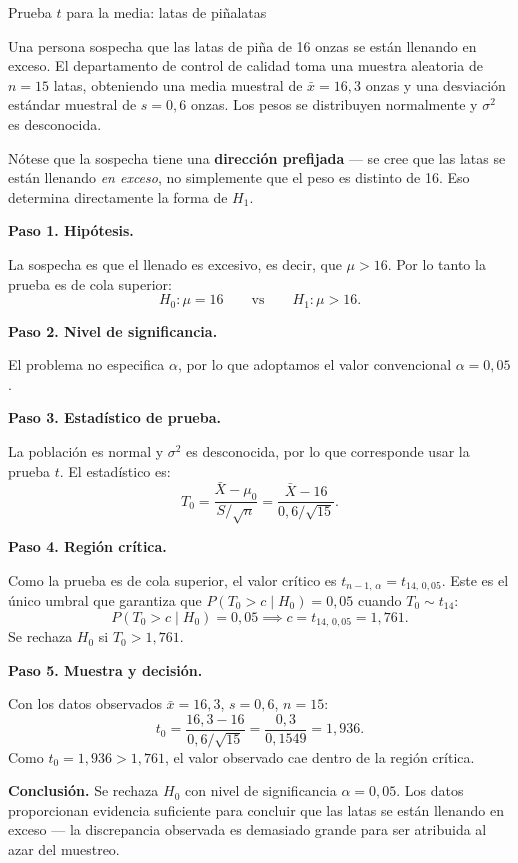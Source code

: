 \documentclass[12pt, a4paper]{book}
\numberwithin{equation}{chapter}
\begin{document}
\begin{ejemplo}{Prueba $t$ para la media:
		latas de pi\~{n}a}{latas}
	
	Una persona sospecha que las latas de pi\~{n}a
	de 16 onzas se est\'{a}n llenando en exceso.
	El departamento de control de calidad toma una
	muestra aleatoria de $n = 15$ latas, obteniendo
	una media muestral de $\bar{x} = 16{,}3$ onzas
	y una desviaci\'{o}n est\'{a}ndar muestral de
	$s = 0{,}6$ onzas. Los pesos se distribuyen
	normalmente y $\sigma^2$ es desconocida.
	
	N\'{o}tese que la sospecha tiene una
	\textbf{direcci\'{o}n prefijada} --- se cree
	que las latas se est\'{a}n llenando \emph{en
		exceso}, no simplemente que el peso es distinto
	de 16. Eso determina directamente la forma de
	$H_1$.
	
	\medskip
	\textbf{Paso 1. Hip\'{o}tesis.}
	
	La sospecha es que el llenado es excesivo,
	es decir, que $\mu > 16$. Por lo tanto la
	prueba es de cola superior:
	\[
	H_0: \mu = 16 \qquad \text{vs} \qquad
	H_1: \mu > 16.
	\]
	
	\medskip
	\textbf{Paso 2. Nivel de significancia.}
	
	El problema no especifica $\alpha$, por lo
	que adoptamos el valor convencional
	$\alpha = 0{,}05$.
	
	\medskip
	\textbf{Paso 3. Estad\'{i}stico de prueba.}
	
	La poblaci\'{o}n es normal y $\sigma^2$ es
	desconocida, por lo que corresponde usar la
	prueba $t$. El estad\'{i}stico es:
	\[
	T_0 = \frac{\bar{X} - \mu_0}
	{S/\sqrt{n}}
	= \frac{\bar{X} - 16}
	{0{,}6/\sqrt{15}}.
	\]
	
	\medskip
	\textbf{Paso 4. Regi\'{o}n cr\'{i}tica.}
	
	Como la prueba es de cola superior, el valor
	cr\'{i}tico es $t_{n-1,\,\alpha} =
	t_{14,\,0{,}05}$. Este es el \'{u}nico umbral
	que garantiza que $P(T_0 > c \mid H_0) =
	0{,}05$ cuando $T_0 \sim t_{14}$:
	\[
	P(T_0 > c \mid H_0) = 0{,}05
	\implies c = t_{14,\,0{,}05} = 1{,}761.
	\]
	Se rechaza $H_0$ si $T_0 > 1{,}761$.
	
	\medskip
	\textbf{Paso 5. Muestra y decisi\'{o}n.}
	
	Con los datos observados $\bar{x} = 16{,}3$,
	$s = 0{,}6$, $n = 15$:
	\[
	t_0 = \frac{16{,}3 - 16}
	{0{,}6/\sqrt{15}}
	= \frac{0{,}3}{0{,}1549}
	= 1{,}936.
	\]
	Como $t_0 = 1{,}936 > 1{,}761$, el valor
	observado cae dentro de la regi\'{o}n
	cr\'{i}tica.
	
	\medskip
	\textbf{Conclusi\'{o}n.} Se rechaza $H_0$
	con nivel de significancia $\alpha = 0{,}05$.
	Los datos proporcionan evidencia suficiente
	para concluir que las latas se est\'{a}n
	llenando en exceso --- la discrepancia
	observada es demasiado grande para ser
	atribuida al azar del muestreo.
	
\end{ejemplo}
\end{document}
